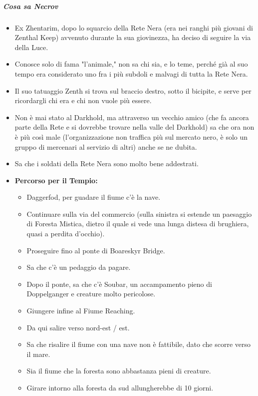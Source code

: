 \documentclass{article}
\begin{document}
                \subparagraph{Cosa sa Necrov}
                \begin{itemize}
                    \item Ex Zhentarim, dopo lo squarcio della Rete Nera (era nei ranghi più giovani di Zenthal Keep) avvenuto durante la sua giovinezza, ha deciso di seguire la via della Luce.
                    \item Conosce solo di fama "l'animale," non sa chi sia, e lo teme, perché già al suo tempo era considerato uno fra i più subdoli e malvagi di tutta la Rete Nera.
                    \item Il suo tatuaggio Zenth si trova sul braccio destro, sotto il bicipite, e serve per ricordargli chi era e chi non vuole più essere.
                    \item Non è mai stato al Darkhold, ma attraverso un vecchio amico (che fa ancora parte della Rete e si dovrebbe trovare nella valle del Darkhold) sa che ora non è più così male (l’organizzazione non traffica più sul mercato nero, è solo un gruppo di mercenari al servizio di altri) anche se ne dubita.
                    \item Sa che i soldati della Rete Nera sono molto bene addestrati.
                    \item \textbf{Percorso per il Tempio:}
                    \begin{itemize}
                        \item Daggerfod, per guadare il fiume c'è la nave.
                        \item Continuare sulla via del commercio (sulla sinistra si estende un paesaggio di Foresta Mistica, dietro il quale si vede una lunga distesa di brughiera, quasi a perdita d’occhio).
                        \item Proseguire fino al ponte di Boareskyr Bridge.
                        \item Sa che c'è un pedaggio da pagare.
                        \item Dopo il ponte, sa che c'è Soubar, un accampamento pieno di Doppelganger e creature molto pericolose.
                        \item Giungere infine al Fiume Reaching.
                        \item Da qui salire verso nord-est / est.
                        \item Sa che risalire il fiume con una nave non è fattibile, dato che scorre verso il mare.
                        \item Sia il fiume che la foresta sono abbastanza pieni di creature.
                        \item Girare intorno alla foresta da sud allungherebbe di 10 giorni.
                    \end{itemize}
                \end{itemize}
                
\end{document}
